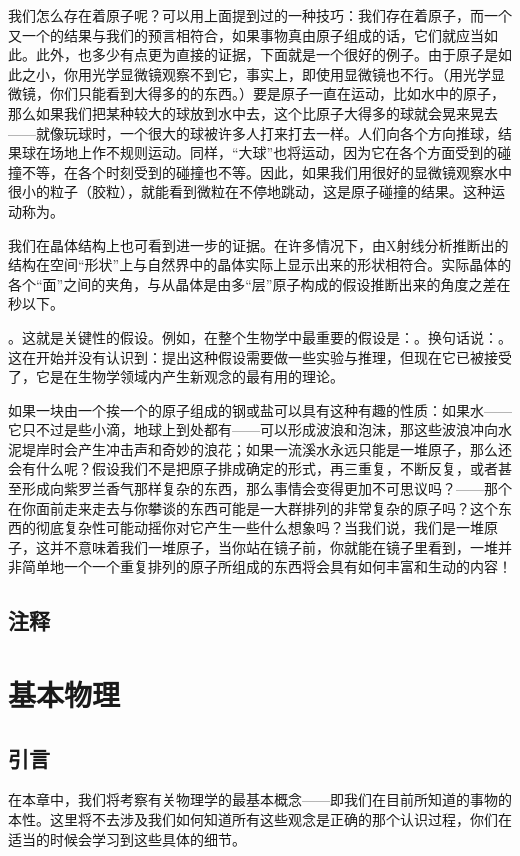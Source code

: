 \documentclass[11pt,oneside]{book}
\begin{document}
\begin{common-format}
我们怎么存在着原子呢？可以用上面提到过的一种技巧：我们存在着原子，而一个又一个的结果与我们的预言相符合，如果事物真由原子组成的话，它们就应当如此。此外，也多少有点更为直接的证据，下面就是一个很好的例子。由于原子是如此之小，你用光学显微镜观察不到它，事实上，即使用显微镜也不行。（用光学显微镜，你们只能看到大得多的的东西。）要是原子一直在运动，比如水中的原子，那么如果我们把某种较大的球放到水中去，这个比原子大得多的球就会晃来晃去——就像玩球时，一个很大的球被许多人打来打去一样。人们向各个方向推球，结果球在场地上作不规则运动。同样，“大球”也将运动，因为它在各个方面受到的碰撞不等，在各个时刻受到的碰撞也不等。因此，如果我们用很好的显微镜观察水中很小的粒子（胶粒），就能看到微粒在不停地跳动，这是原子碰撞的结果。这种运动称为。

我们在晶体结构上也可看到进一步的证据。在许多情况下，由X射线分析推断出的结构在空间“形状”上与自然界中的晶体实际上显示出来的形状相符合。实际晶体的各个“面”之间的夹角，与从晶体是由多“层”原子构成的假设推断出来的角度之差在秒以下。

。这就是关键性的假设。例如，在整个生物学中最重要的假设是：。换句话说：。这在开始并没有认识到：提出这种假设需要做一些实验与推理，但现在它已被接受了，它是在生物学领域内产生新观念的最有用的理论。

如果一块由一个挨一个的原子组成的钢或盐可以具有这种有趣的性质：如果水——它只不过是些小滴，地球上到处都有——可以形成波浪和泡沫，那这些波浪冲向水泥堤岸时会产生冲击声和奇妙的浪花；如果一流溪水永远只能是一堆原子，那么还会有什么呢？假设我们不是把原子排成确定的形式，再三重复，不断反复，或者甚至形成向紫罗兰香气那样复杂的东西，那么事情会变得更加不可思议吗？——那个在你面前走来走去与你攀谈的东西可能是一大群排列的非常复杂的原子吗？这个东西的彻底复杂性可能动摇你对它产生一些什么想象吗？当我们说，我们是一堆原子，这并不意味着我们一堆原子，当你站在镜子前，你就能在镜子里看到，一堆并非简单地一个一个重复排列的原子所组成的东西将会具有如何丰富和生动的内容！


\section{注释}
\showendnotes


\chapter{基本物理}
\section{引言}
在本章中，我们将考察有关物理学的最基本概念——即我们在目前所知道的事物的本性。这里将不去涉及我们如何知道所有这些观念是正确的那个认识过程，你们在适当的时候会学习到这些具体的细节。


\end{common-format}
\end{document}
